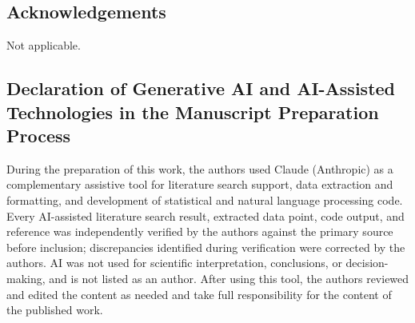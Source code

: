 \documentclass[5p,times,twocolumn]{elsarticle}
\begin{document}
\subsection*{Acknowledgements}

Not applicable.

\subsection*{Declaration of Generative AI and AI-Assisted Technologies in the Manuscript Preparation Process}

During the preparation of this work, the authors used Claude (Anthropic) as a complementary assistive tool for literature search support, data extraction and formatting, and development of statistical and natural language processing code. Every AI-assisted literature search result, extracted data point, code output, and reference was independently verified by the authors against the primary source before inclusion; discrepancies identified during verification were corrected by the authors. AI was not used for scientific interpretation, conclusions, or decision-making, and is not listed as an author. After using this tool, the authors reviewed and edited the content as needed and take full responsibility for the content of the published work.
\end{document}
